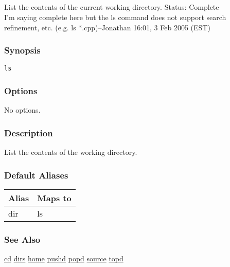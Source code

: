\subsection{}
\label{ls}
List the contents of the current working directory. 
 Status: Complete\\ 
I'm saying complete here but the ls command does not support search refinement, etc. (e.g. ls *.cpp)--Jonathan 16:01, 3 Feb 2005 (EST) 
\subsubsection*{Synopsis}
\begin{verbatim}
ls
\end{verbatim}
\subsubsection*{Options}
 No options. 
\subsubsection*{Description}
 List the contents of the working directory. 
\subsubsection*{Default Aliases}
\begin{tabular}{|l|l|}
\hline 
 Alias  & Maps to  \\
 \hline 
 dir  & ls  \\
 \hline 
\end{tabular}
\subsubsection*{See Also}
\hyperref[cd]{cd} \hyperref[dirs]{dirs} \hyperref[home]{home} \hyperref[pushd]{pushd} \hyperref[popd]{popd} \hyperref[source]{source} \hyperref[topd]{topd} 